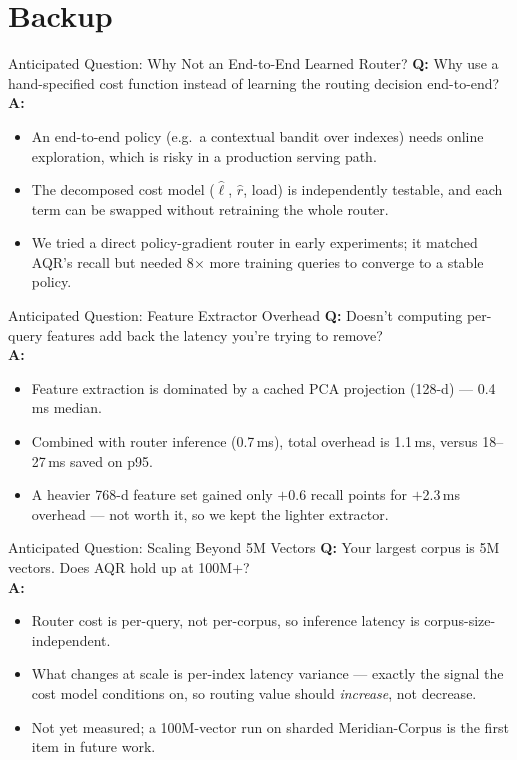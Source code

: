 \appendix
{}

\section{Backup}

\begin{frame}{Anticipated Question: Why Not an End-to-End Learned Router?}
\textbf{Q:} Why use a hand-specified cost function instead of learning the routing decision end-to-end?\\[6pt]
\textbf{A:}
\begin{itemize}
\item An end-to-end policy (e.g.\ a contextual bandit over indexes) needs online exploration, which is risky in a production serving path.
\item The decomposed cost model ($\widehat{\ell}$, $\widehat{r}$, load) is independently testable, and each term can be swapped without retraining the whole router.
\item We tried a direct policy-gradient router in early experiments; it matched AQR's recall but needed 8$\times$ more training queries to converge to a stable policy.
\end{itemize}
\end{frame}

\begin{frame}{Anticipated Question: Feature Extractor Overhead}
\textbf{Q:} Doesn't computing per-query features add back the latency you're trying to remove?\\[6pt]
\textbf{A:}
\begin{itemize}
\item Feature extraction is dominated by a cached PCA projection (128-d) --- 0.4\,ms median.
\item Combined with router inference (0.7\,ms), total overhead is 1.1\,ms, versus 18--27\,ms saved on p95.
\item A heavier 768-d feature set gained only $+$0.6 recall points for $+$2.3\,ms overhead --- not worth it, so we kept the lighter extractor.
\end{itemize}
\end{frame}

\begin{frame}{Anticipated Question: Scaling Beyond 5M Vectors}
\textbf{Q:} Your largest corpus is 5M vectors. Does AQR hold up at 100M+?\\[6pt]
\textbf{A:}
\begin{itemize}
\item Router cost is per-query, not per-corpus, so inference latency is corpus-size-independent.
\item What changes at scale is per-index latency variance --- exactly the signal the cost model conditions on, so routing value should \emph{increase}, not decrease.
\item Not yet measured; a 100M-vector run on sharded Meridian-Corpus is the first item in future work.
\end{itemize}
\end{frame}

